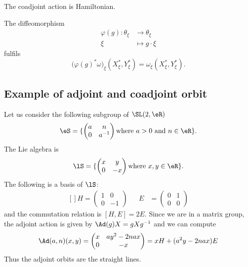 \begin{proposition}
The coadjoint action is Hamiltonian.
\end{proposition}

\begin{proposition}
The diffeomorphism 
\begin{equation}
\begin{aligned}
 \varphi(g)\colon \theta_{\xi}&\to \theta_{\xi} \\ 
  \xi&\mapsto g\cdot \xi 
\end{aligned}
\end{equation}
fulfils 
\[
   \big(\varphi(g)^*\omega\big)_{\xi}(X^*_{\xi},Y^*_{\xi})=\omega_{\xi}(X^*_{\xi},Y^*_{\xi}).
\]
\end{proposition}

\subsection{Example of adjoint and coadjoint orbit}

Let us consider the following subgroup of $\SL(2,\eR)$
\begin{equation}
	\eS=\{ \begin{pmatrix}
		a	&	n	\\ 
		0	&	a^{-1}	
	\end{pmatrix}\text{where $a>0$ and $n\in\eR$}\}.
\end{equation}
The Lie algebra is
\begin{equation}
	\lS=\{ \begin{pmatrix}
		x	&	y	\\ 
		0	&	-x	
	\end{pmatrix}\text{where $x,y\in\eR$}\}.
\end{equation}
The following is a basis of $\lS$:
\begin{equation}
	\begin{aligned}[]
		H=\begin{pmatrix}
			1	&	0	\\ 
			0	&	-1	
		\end{pmatrix}&&E&=\begin{pmatrix}
			0	&	1	\\ 
			0	&	0	
		\end{pmatrix}
	\end{aligned}
\end{equation}
and the commutation relation is $[H,E]=2E$. Since we are in a matrix group, the adjoint action is given by $\Ad(g)X=gXg^{-1}$ and we can compute
\begin{equation}
	\Ad(a,n)(x,y)=\begin{pmatrix}
		x	&	ay^2-2nax	\\ 
		0	&	-x	
	\end{pmatrix}
	=
	xH+(a^2y-2nax)E
\end{equation}
Thus the adjoint orbits are the straight lines.

